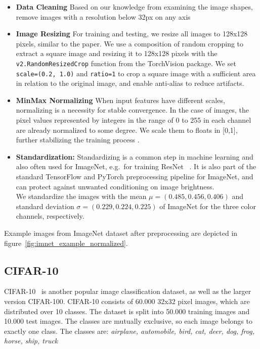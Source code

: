 \begin{itemize}
    \item \textbf{Data Cleaning}
    Based on our knowledge from examining the image shapes, remove images with a resolution below 32px on any axis
    \item \textbf{Image Resizing}
    For training and testing, we resize all images to 128x128 pixels, similar to the paper.
    We use a composition of random cropping to extract a square image and resizing it to 128x128 pixels with
    the \texttt{v2.RandomResizedCrop} function from the TorchVision package.
    We set \texttt{scale=(0.2, 1.0)} and \texttt{ratio=1} to crop a square image with a sufficient area in
    relation to the original image, and enable anti-alias to reduce artifacts.
    \item \textbf{MinMax Normalizing}
    When input features have different scales, normalizing is a necessity for stable convergence.
    In the case of images, the pixel values represented by integers in the range of 0 to 255
    in each channel are already normalized to some degree.
    We scale them to floats in [0,1], further stabilizing the training process \cite{citationNeeded}.
    \item \textbf{Standardization:}
    Standardizing is a common step in machine learning and also often used for ImageNet, e.g.\ for training ResNet
    ~\cite{resnet}.
    It is also part of the standard TensorFlow and PyTorch preprocessing pipeline for ImageNet, and can protect
    against unwanted conditioning on image brightness. \\
    We standardize the images with the mean $\mu = (0.485, 0.456, 0.406)$ and standard deviation
    $\sigma = (0.229, 0.224, 0.225)$ of ImageNet for the three color channels, respectively.
\end{itemize}

Example images from ImageNet dataset after preprocessing are depicted in figure~\ref{fig:imnet_example_normalized}.

\subsection{CIFAR-10}\label{subsec:cifar-10}
CIFAR-10~\cite{cifar10} is another popular image classification dataset, as well as the larger version CIFAR-100.
CIFAR-10 consists of 60.000 32x32 pixel images, which are distributed over 10 classes.
The dataset is split into 50.000 training images and 10.000 test images.
The classes are mutually exclusive, so each image belongs to exactly one class.
The classes are: \textit{airplane, automobile, bird, cat, deer, dog, frog, horse, ship, truck}

